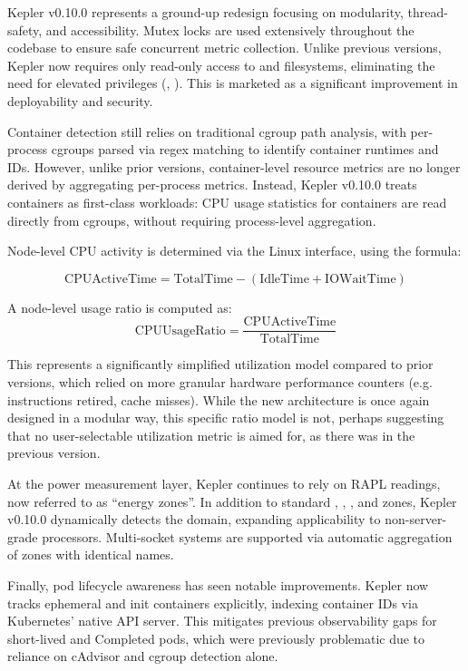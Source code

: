 Kepler v0.10.0 represents a ground-up redesign focusing on modularity, thread-safety, and accessibility. Mutex locks are used extensively throughout the codebase to ensure safe concurrent metric collection. Unlike previous versions, Kepler now requires only read-only access to  and  filesystems, eliminating the need for elevated privileges (, ). This is marketed as a significant improvement in deployability and security.

Container detection still relies on traditional cgroup path analysis, with per-process cgroups parsed via regex matching to identify container runtimes and IDs. However, unlike prior versions, container-level resource metrics are no longer derived by aggregating per-process metrics. Instead, Kepler v0.10.0 treats containers as first-class workloads: CPU usage statistics for containers are read directly from cgroups, without requiring process-level aggregation.

Node-level CPU activity is determined via the Linux  interface, using the formula:

\begin{equation}
\text{CPUActiveTime} = \text{TotalTime} - (\text{IdleTime} + \text{IOWaitTime})
\end{equation}

A node-level usage ratio is computed as:
\begin{equation}
\text{CPUUsageRatio} = \frac{\text{CPUActiveTime}}{\text{TotalTime}}
\end{equation}

This represents a significantly simplified utilization model compared to prior versions, which relied on more granular hardware performance counters (e.g. instructions retired, cache misses). While the new architecture is once again designed in a modular way, this specific ratio model is not, perhaps suggesting that no user-selectable utilization metric is aimed for, as there was in the previous version.

At the power measurement layer, Kepler continues to rely on RAPL readings, now referred to as ``energy zones''. In addition to standard , , , and  zones, Kepler v0.10.0 dynamically detects the  domain, expanding applicability to non-server-grade processors. Multi-socket systems are supported via automatic aggregation of zones with identical names.

Finally, pod lifecycle awareness has seen notable improvements. Kepler now tracks ephemeral and init containers explicitly, indexing container IDs via Kubernetes' native API server. This mitigates previous observability gaps for short-lived and Completed pods, which were previously problematic due to reliance on cAdvisor and cgroup detection alone.

